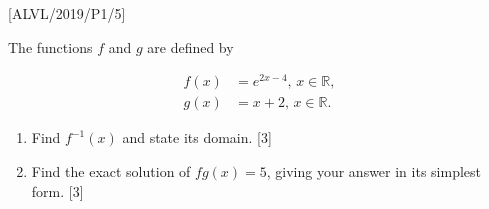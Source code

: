 \item {[}ALVL/2019/P1/5{]}

The functions $f$ and $g$ are defined by 

\begin{align*}
f\left(x\right) & =e^{2x-4},\,x\in\mathbb{R},\\
g\left(x\right) & =x+2,\,x\in\mathbb{R}.
\end{align*}

\begin{enumerate}
\item Find $f^{-1}\left(x\right)$ and state its domain. \hfill{}{[}3{]}
\item Find the exact solution of $fg\left(x\right)=5$, giving your answer
in its simplest form. \hfill{}{[}3{]}
\end{enumerate}
